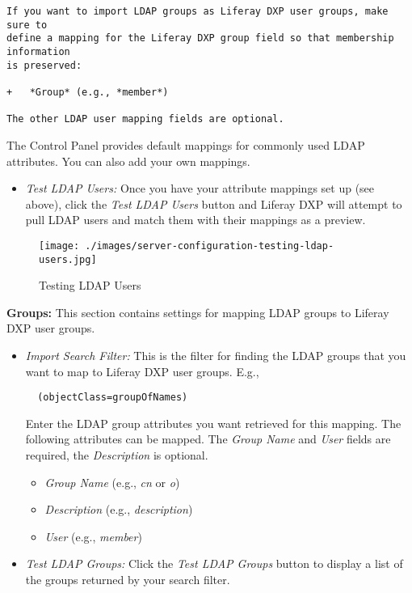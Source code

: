 \begin{verbatim}
If you want to import LDAP groups as Liferay DXP user groups, make sure to
define a mapping for the Liferay DXP group field so that membership information
is preserved:

+   *Group* (e.g., *member*)

The other LDAP user mapping fields are optional.
\end{verbatim}

The Control Panel provides default mappings for commonly used LDAP
attributes. You can also add your own mappings.

\begin{itemize}
\tightlist
\item
  \emph{Test LDAP Users:} Once you have your attribute mappings set up
  (see above), click the \emph{Test LDAP Users} button and Liferay DXP
  will attempt to pull LDAP users and match them with their mappings as
  a preview.
\end{itemize}

\begin{figure}
\centering
\texttt{[image: ./images/server-configuration-testing-ldap-users.jpg]}
\caption{Testing LDAP Users}
\end{figure}

\textbf{Groups:} This section contains settings for mapping LDAP groups
to Liferay DXP user groups.

\begin{itemize}
\item
  \emph{Import Search Filter:} This is the filter for finding the LDAP
  groups that you want to map to Liferay DXP user groups. E.g.,

\begin{verbatim}
  (objectClass=groupOfNames)
\end{verbatim}

  Enter the LDAP group attributes you want retrieved for this mapping.
  The following attributes can be mapped. The \emph{Group Name} and
  \emph{User} fields are required, the \emph{Description} is optional.

  \begin{itemize}
  \item
    \emph{Group Name} (e.g., \emph{cn} or \emph{o})
  \item
    \emph{Description} (e.g., \emph{description})
  \item
    \emph{User} (e.g., \emph{member})
  \end{itemize}
\item
  \emph{Test LDAP Groups:} Click the \emph{Test LDAP Groups} button to
  display a list of the groups returned by your search filter.
\end{itemize}

